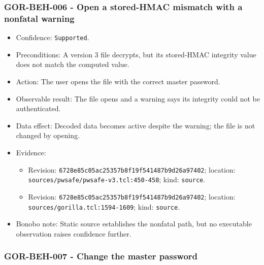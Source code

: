\documentclass[
  letterpaper,
]{article}
\newcommand{\passthrough}[1]{#1}
\providecommand{\tightlist}{%
  \setlength{\itemsep}{0pt}\setlength{\parskip}{0pt}}
\begin{document}
\subsubsection{GOR-BEH-006 - Open a stored-HMAC mismatch with a nonfatal
warning}\label{gor-beh-006---open-a-stored-hmac-mismatch-with-a-nonfatal-warning}

\begin{itemize}
\tightlist
\item
  Confidence: \passthrough{\lstinline!Supported!}.
\item
  Preconditions: A version 3 file decrypts, but its stored-HMAC integrity value does not match the computed value.
\item
  Action: The user opens the file with the correct master password.
\item
  Observable result: The file opens and a warning says its integrity could not be authenticated.
\item
  Data effect: Decoded data becomes active despite the warning; the file is not changed by opening.
\item
  Evidence:

  \begin{itemize}
  \tightlist
  \item
    Revision: \nolinkurl{6728e85c05ac25357b8f19f541487b9d26a97402}; location:
    \nolinkurl{sources/pwsafe/pwsafe-v3.tcl:450-458}; kind: \passthrough{\lstinline!source!}.
  \item
    Revision: \nolinkurl{6728e85c05ac25357b8f19f541487b9d26a97402}; location: \nolinkurl{sources/gorilla.tcl:1594-1609};
    kind: \passthrough{\lstinline!source!}.
  \end{itemize}
\item
  Bonobo note: Static source establishes the nonfatal path, but no executable observation raises confidence further.
\end{itemize}

\subsubsection{GOR-BEH-007 - Change the master password}\label{gor-beh-007---change-the-master-password}
\end{document}
